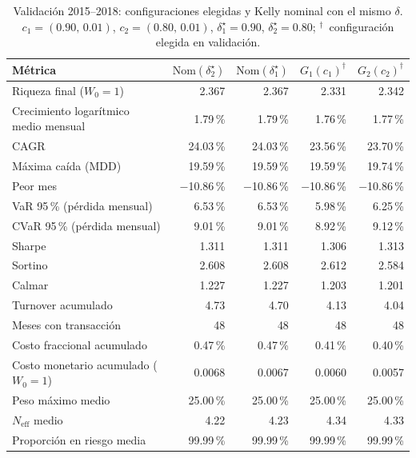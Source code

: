 \begin{table}[h]
\centering
\footnotesize
\setlength{\tabcolsep}{4pt}
\caption{Validación 2015--2018: configuraciones elegidas y Kelly nominal con el mismo $\delta$. $c_1=(0.90,\,0.01)$, $c_2=(0.80,\,0.01)$, $\delta_1^\star=0.90$, $\delta_2^\star=0.80$; $^{\dagger}$~configuración elegida en validación.}\label{tab:r2_d}
\begin{tabular}{|l|r|r|r|r|}
\hline
\textbf{Métrica} & \textbf{$\mathrm{Nom}(\delta_2^\star)$} & \textbf{$\mathrm{Nom}(\delta_1^\star)$} & \textbf{$G_1(c_1)^{\dagger}$} & \textbf{$G_2(c_2)^{\dagger}$} \\ \hline
Riqueza final ($W_0=1$) & 2.367 & 2.367 & 2.331 & 2.342 \\ \hline
Crecimiento logarítmico medio mensual & 1.79\,\% & 1.79\,\% & 1.76\,\% & 1.77\,\% \\ \hline
CAGR & 24.03\,\% & 24.03\,\% & 23.56\,\% & 23.70\,\% \\ \hline
Máxima caída (MDD) & 19.59\,\% & 19.59\,\% & 19.59\,\% & 19.74\,\% \\ \hline
Peor mes & $-$10.86\,\% & $-$10.86\,\% & $-$10.86\,\% & $-$10.86\,\% \\ \hline
VaR 95\,\% (pérdida mensual) & 6.53\,\% & 6.53\,\% & 5.98\,\% & 6.25\,\% \\ \hline
CVaR 95\,\% (pérdida mensual) & 9.01\,\% & 9.01\,\% & 8.92\,\% & 9.12\,\% \\ \hline
Sharpe & 1.311 & 1.311 & 1.306 & 1.313 \\ \hline
Sortino & 2.608 & 2.608 & 2.612 & 2.584 \\ \hline
Calmar & 1.227 & 1.227 & 1.203 & 1.201 \\ \hline
Turnover acumulado & 4.73 & 4.70 & 4.13 & 4.04 \\ \hline
Meses con transacción & 48 & 48 & 48 & 48 \\ \hline
Costo fraccional acumulado & 0.47\,\% & 0.47\,\% & 0.41\,\% & 0.40\,\% \\ \hline
Costo monetario acumulado ($W_0=1$) & 0.0068 & 0.0067 & 0.0060 & 0.0057 \\ \hline
Peso máximo medio & 25.00\,\% & 25.00\,\% & 25.00\,\% & 25.00\,\% \\ \hline
$N_{\mathrm{eff}}$ medio & 4.22 & 4.23 & 4.34 & 4.33 \\ \hline
Proporción en riesgo media & 99.99\,\% & 99.99\,\% & 99.99\,\% & 99.99\,\% \\ \hline
\end{tabular}
\end{table}
